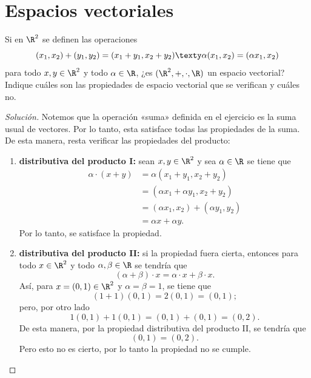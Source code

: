 \documentclass[a4,11pt]{aleph-notas}
\begin{document}
\encabezado


\section{Espacios vectoriales}

\begin{ejer}
    Si en $\R^2$ se definen las operaciones
\[
(x_1,x_2) + (y_1,y_2) = (x_1+y_1,x_2+y_2) \texty \alpha(x_1,x_2) = (\alpha x_1,x_2)
\]
para todo $x,y\in\R^2$ y todo $\alpha\in\R$, ¿es $(\R^2,+,\cdot,\R)$ un espacio vectorial? Indique cuáles son las propiedades de espacio vectorial que se verifican y cuáles no.
\end{ejer}

\begin{proof}[Solución]\hspace{0pt}
    Notemos que la operación «suma» definida en el ejercicio es la suma usual de vectores. Por lo tanto, esta satisface todas las propiedades de la suma. De esta manera, resta verificar las propiedades del producto:
    \begin{enumerate}
    \item \textbf{distributiva del producto I:}
        sean $x,y\in \R^2$ y sea $\alpha\in \R$ se tiene que
        \begin{align*}
            \alpha\cdot (x + y) & = \alpha (x_1+y_1 , x_2 + y_2) \\
                & = (\alpha x_1 + \alpha y_1 , x_2 + y_2 ) \\
                & = (\alpha x_1,x_2) + (\alpha y_1,y_2) \\
                & = \alpha x + \alpha y.
        \end{align*}
        Por lo tanto, se satisface la propiedad.
    \item \textbf{distributiva del producto II:}
        si la propiedad fuera cierta, entonces para todo $x\in \R^2$ y todo $\alpha,\beta\in \R$ se tendría que
        \[
            (\alpha+\beta)\cdot x=\alpha\cdot x + \beta\cdot x.
        \]
        Así, para $x=(0,1)\in\R^2$ y $\alpha=\beta=1$, se tiene que 
        \[
            (1 + 1)(0,1) = 2(0,1) = (0,1);
        \]
        pero, por otro lado 
        \[
            1 (0,1) + 1(0,1) = (0,1)+(0,1) = (0,2).
        \]
        De esta manera, por la propiedad distributiva del producto II, se tendría que 
        \[
            (0,1) = (0,2).
        \]
        Pero esto no es cierto, por lo tanto la propiedad no se cumple. 
        

\end{enumerate}
\end{proof}
\end{document}

